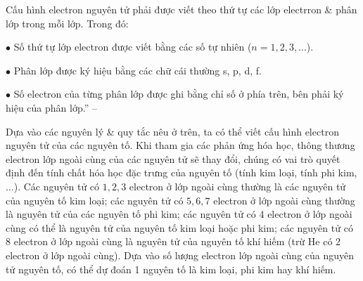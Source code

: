 \documentclass{article}
\numberwithin{equation}{section}
\begin{document}
Cấu hình electron nguyên tử phải được viết theo thứ tự các lớp electrron \& phân lớp trong mỗi lớp. Trong đó:
\begin{enumerate*}
	\item[$\bullet$] Số thứ tự lớp electron được viết bằng các số tự nhiên ($n = 1,2,3,\ldots$).
	\item[$\bullet$] Phân lớp được ký hiệu bằng các chữ cái thường s, p, d, f.
	\item[$\bullet$] Số electron của từng phân lớp được ghi bằng chỉ số ở phía trên, bên phải ký hiệu của phân lớp.'' -- \cite[p. 32]{SGK_Hoa_Hoc_10_Chan_Troi_Sang_Tao}
\end{enumerate*}
Dựa vào các nguyên lý \& quy tắc nêu ở trên, ta có thể viết cấu hình electron nguyên tử của các nguyên tố. Khi tham gia các phản ứng hóa học, thông thương electron lớp ngoài cùng của các nguyên tử sẽ thay đổi, chúng có vai trò quyết định đến tính chất hóa học đặc trưng của nguyên tố (tính kim loại, tính phi kim, $\ldots$). Các nguyên tử có $1,2,3$ electron ở lớp ngoài cùng thường là các nguyên tử của nguyên tố kim loại; các nguyên tử có $5,6,7$ electron ở lớp ngoài cùng thường là nguyên tử của các nguyên tố phi kim; các nguyên tử có 4 electron ở lớp ngoài cùng có thể là nguyên tử của nguyên tố kim loại hoặc phi kim; các nguyên tử có 8 electron ở lớp ngoài cùng là nguyên tử của nguyên tố khí hiếm (trừ He có 2 electron ở lớp ngoài cùng). Dựa vào số lượng electron lớp ngoài cùng của nguyên tử nguyên tố, có thể dự đoán 1 nguyên tố là kim loại, phi kim hay khí hiếm.

\end{document}

